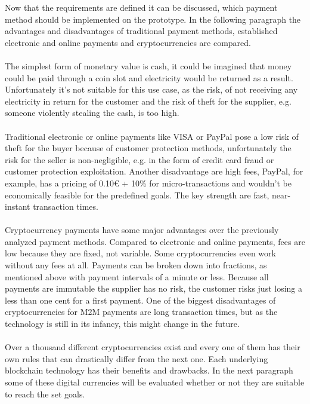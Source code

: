 Now that the requirements are defined it can be discussed, which payment method should be implemented on the prototype. In the following paragraph the advantages and disadvantages of traditional payment methods, established electronic and online payments and cryptocurrencies are compared.
\\\\
The simplest form of monetary value is cash, it could be imagined that money could be paid through a coin slot and electricity would be returned as a result. Unfortunately it’s not suitable for this use case, as the risk, of not receiving any electricity in return for the customer and the risk of theft for the supplier, e.g. someone violently stealing the cash, is too high.
\\\\
Traditional electronic or online payments like VISA or PayPal pose a low risk of theft for the buyer because of customer protection methods, unfortunately the risk for the seller is non-negligible, e.g. in the form of credit card fraud or customer protection exploitation. Another disadvantage are high fees, PayPal, for example, has a pricing of 0.10\euro{} + 10\% for micro-transactions\cite{paypal-fees} and wouldn’t be economically feasible for the predefined goals. The key strength are fast, near-instant transaction times.
\\\\
Cryptocurrency payments have some major advantages over the previously analyzed payment methods. Compared to electronic and online payments, fees are low because they are fixed, not variable. Some cryptocurrencies even work without any fees at all. Payments can be broken down into fractions, as mentioned above with payment intervals of a minute or less. Because all payments are immutable the supplier has no risk, the customer risks just losing a less than one cent for a first payment. One of the biggest disadvantages of cryptocurrencies for M2M payments are long transaction times, but as the technology is still in its infancy, this might change in the future.
\\\\
Over a thousand different cryptocurrencies exist and every one of them has their own rules that can drastically differ from the next one. Each underlying blockchain technology has their benefits and drawbacks. In the next paragraph some of these digital currencies will be evaluated whether or not they are suitable to reach the set goals.
\\\\
